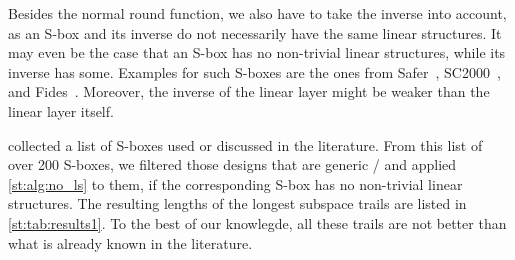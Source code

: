 Besides the normal round function, we also have to take the inverse into account, as an S-box and its inverse do not necessarily have the same linear structures.
It may even be the case that an S-box has no non-trivial linear structures, while its inverse has some.
Examples for such S-boxes are the ones from Safer~, SC2000~, and Fides~.
Moreover, the inverse of the linear layer might be weaker than the linear layer itself.

\textcite{PhD:Perrin17} collected a list of S-boxes used or discussed in the literature.
From this list of over 200 S-boxes, we filtered those designs that are generic \SPNp/ and applied \cref{st:alg:no_ls} to them, if the corresponding S-box has no non-trivial linear structures.
The resulting lengths of the longest subspace trails are listed in \cref{st:tab:results1}.
To the best of our knowlegde, all these trails are not better than what is already known in the literature.

